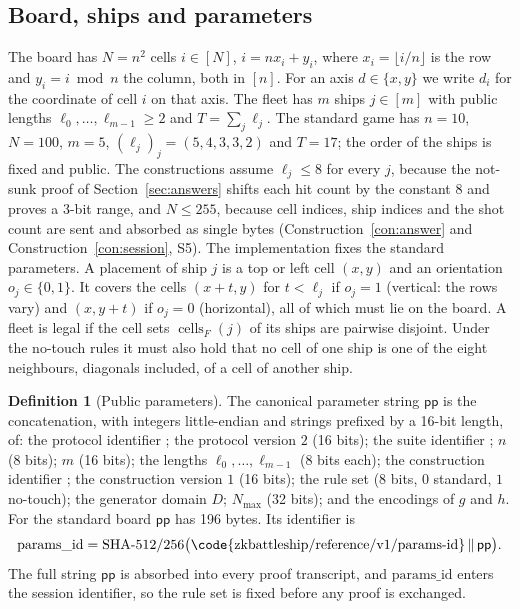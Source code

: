 \documentclass[11pt]{article}
\theoremstyle{definition}
\newtheorem{definition}[lemma]{Definition}
\theoremstyle{remark}
\newcommand{\cells}{\operatorname{cells}}
\newcommand{\pp}{\mathsf{pp}}
\begin{document}
\subsection{Board, ships and parameters}\label{sec:board}
The board has $N=n^2$ cells $i\in[N]$, $i=nx_i+y_i$, where $x_i=\lfloor i/n\rfloor$ is the row and $y_i=i\bmod n$ the column, both in $[n]$. For an axis $d\in\{x,y\}$ we write $d_i$ for the coordinate of cell $i$ on that axis. The fleet has $m$ ships $j\in[m]$ with public lengths $\ell_0,\ldots,\ell_{m-1}\ge2$ and $T=\sum_j\ell_j$. The standard game has $n=10$, $N=100$, $m=5$, $(\ell_j)_j=(5,4,3,3,2)$ and $T=17$; the order of the ships is fixed and public. The constructions assume $\ell_j\le8$ for every $j$, because the not-sunk proof of Section~\ref{sec:answers} shifts each hit count by the constant $8$ and proves a $3$-bit range, and $N\le255$, because cell indices, ship indices and the shot count are sent and absorbed as single bytes (Construction~\ref{con:answer} and Construction~\ref{con:session}, S5). The implementation fixes the standard parameters. A placement of ship $j$ is a top or left cell $(x,y)$ and an orientation $o_j\in\{0,1\}$. It covers the cells $(x+t,y)$ for $t<\ell_j$ if $o_j=1$ (vertical: the rows vary) and $(x,y+t)$ if $o_j=0$ (horizontal), all of which must lie on the board. A fleet is legal if the cell sets $\cells_F(j)$ of its ships are pairwise disjoint. Under the no-touch rules it must also hold that no cell of one ship is one of the eight neighbours, diagonals included, of a cell of another ship.

\begin{definition}[Public parameters]\label{def:pp}
The canonical parameter string $\pp$ is the concatenation, with integers little-endian and strings prefixed by a 16-bit length, of: the protocol identifier ; the protocol version $2$ (16 bits); the suite identifier ; $n$ (8 bits); $m$ (16 bits); the lengths $\ell_0,\ldots,\ell_{m-1}$ (8 bits each); the construction identifier ; the construction version $1$ (16 bits); the rule set (8 bits, $0$ standard, $1$ no-touch); the generator domain $D$; $N_{\max}$ (32 bits); and the encodings of $g$ and $h$. For the standard board $\pp$ has 196 bytes. Its identifier is
\[
  \mathrm{params\_id}=\text{SHA-512/256}\bigl(\text{\code{zkbattleship/reference/v1/params-id}}\,\|\,\pp\bigr).
\] The full string $\pp$ is absorbed into every proof transcript, and $\mathrm{params\_id}$ enters the session identifier, so the rule set is fixed before any proof is exchanged.
\end{definition}
\end{document}
